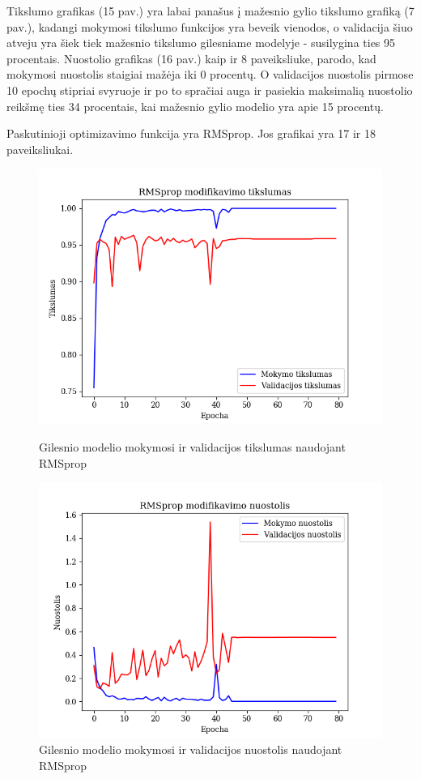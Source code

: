 \documentclass{VUMIFPSkursinis}
\begin{document}
Tikslumo grafikas (15 pav.) yra labai panašus į mažesnio gylio tikslumo grafiką (7 pav.), kadangi mokymosi tikslumo funkcijos yra beveik vienodos, o validacija šiuo atveju yra šiek tiek mažesnio tikslumo gilesniame 
modelyje - susilygina ties 95 procentais.
Nuostolio grafikas (16 pav.) kaip ir 8 paveiksliuke, parodo, kad mokymosi nuostolis staigiai mažėja iki 0 procentų. O validacijos nuostolis pirmose 10 epochų stipriai svyruoje ir po to spračiai auga ir pasiekia maksimalią nuostolio 
reikšmę ties 34 procentais, kai mažesnio gylio modelio yra apie 15 procentų.

Paskutinioji optimizavimo funkcija yra RMSprop. Jos grafikai yra 17 ir 18 paveiksliukai.

\begin{figure}[!htbp]
  \centering
  \begin{minipage}[b]{0.49\textwidth}
    \includegraphics[width=\textwidth]{img/AL/RMSprop_acc.png}
    \caption{Gilesnio modelio mokymosi ir validacijos tikslumas naudojant RMSprop}
  \end{minipage}
  \begin{minipage}[b]{0.49\textwidth}
    \includegraphics[width=\textwidth]{img/AL/RMSprop_loss.png}
    \caption{Gilesnio modelio mokymosi ir validacijos nuostolis naudojant RMSprop}
  \end{minipage}
\end{figure}
\end{document}

